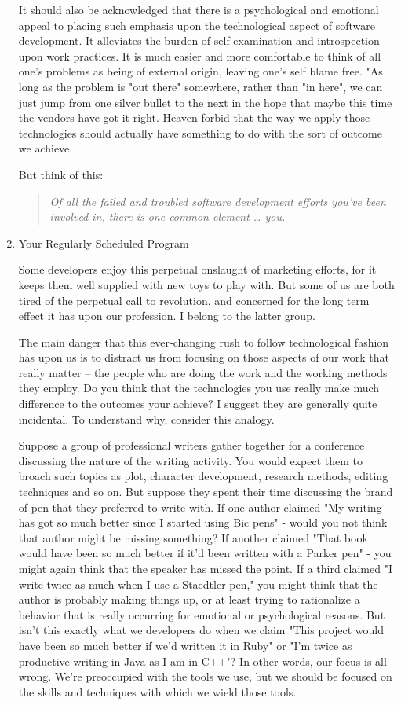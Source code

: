 \documentclass{article}
\begin{document}
\begin{enumerate}
It should also be acknowledged that there is a psychological and
emotional appeal to placing such emphasis upon the technological aspect
of software development. It alleviates the burden of self-examination
and introspection upon work practices. It is much easier and more
comfortable to think of all one's problems as being of external origin,
leaving one's self blame free. "As long as the problem is "out there"
somewhere, rather than "in here", we can just jump from one silver
bullet to the next in the hope that maybe this time the vendors have got
it right. Heaven forbid that the way we apply those technologies should
actually have something to do with the sort of outcome we achieve.

But think of this:

\begin{quote}
\emph{Of all the failed and troubled software development efforts you've
been involved in, there is one common element \ldots{} you.}
\end{quote}

\item Your Regularly Scheduled Program
\label{sec:orgheadline419}

Some developers enjoy this perpetual onslaught of marketing efforts, for
it keeps them well supplied with new toys to play with. But some of us
are both tired of the perpetual call to revolution, and concerned for
the long term effect it has upon our profession. I belong to the latter
group.

The main danger that this ever-changing rush to follow technological
fashion has upon us is to distract us from focusing on those aspects of
our work that really matter -- the people who are doing the work and the
working methods they employ. Do you think that the technologies you use
really make much difference to the outcomes your achieve? I suggest they
are generally quite incidental. To understand why, consider this
analogy.

Suppose a group of professional writers gather together for a conference
discussing the nature of the writing activity. You would expect them to
broach such topics as plot, character development, research methods,
editing techniques and so on. But suppose they spent their time
discussing the brand of pen that they preferred to write with. If one
author claimed "My writing has got so much better since I started using
Bic pens" - would you not think that author might be missing something?
If another claimed "That book would have been so much better if it'd
been written with a Parker pen" - you might again think that the speaker
has missed the point. If a third claimed "I write twice as much when I
use a Staedtler pen," you might think that the author is probably making
things up, or at least trying to rationalize a behavior that is really
occurring for emotional or psychological reasons. But isn't this exactly
what we developers do when we claim "This project would have been so
much better if we'd written it in Ruby" or "I'm twice as productive
writing in Java as I am in C++"? In other words, our focus is all wrong.
We're preoccupied with the tools we use, but we should be focused on the
skills and techniques with which we wield those tools.


\end{enumerate}
\end{document}
